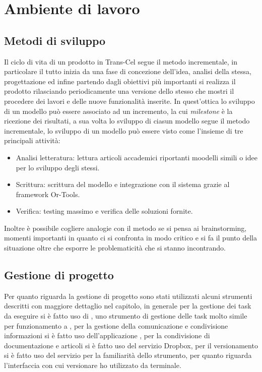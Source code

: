 \section{Ambiente di lavoro}
\subsection{Metodi di sviluppo}
Il ciclo di vita di un prodotto in Trans-Cel segue il metodo incrementale, in particolare il tutto inizia da una fase di concezione dell'idea, analisi della stessa, progettazione ed infine partendo dagli obiettivi più importanti si realizza il prodotto rilasciando periodicamente una versione dello stesso che mostri il procedere dei lavori e delle nuove funzionalità inserite. In quest'ottica lo sviluppo di un modello può essere associato ad un incremento, la cui \textit{milestone} è la ricezione dei risultati, a sua volta lo sviluppo di ciasun modello segue il metodo incrementale, lo sviluppo di un modello può essere visto come l'insieme di tre principali attività:
\begin{itemize}
	\item Analisi letteratura: lettura articoli accademici riportanti moodelli simili o idee per lo sviluppo degli stessi.
	\item Scrittura: scrittura del modello e integrazione con il sistema grazie al framework Or-Tools.
	\item Verifica: testing massimo e verifica delle soluzioni fornite.
\end{itemize}
Inoltre è possibile cogliere analogie con il metodo  se si pensa ai brainstorming, momenti importanti in quanto ci si confronta in modo critico e si fa il punto della situazione oltre che esporre le problematicità che si stanno incontrando.
	
\subsection{Gestione di progetto}
Per quanto riguarda la gestione di progetto sono stati utilizzati alcuni strumenti descritti con maggiore dettaglio nel capitolo, in generale per la gestione dei task da eseguire si è fatto uso di , uno strumento di gestione delle task molto simile per funzionamento a , per la gestione della comunicazione e condivisione informazioni si è fatto uso dell'applicazione , per la condivisione di documentazione e articoli si è fatto uso del servizio Dropbox, per il versionamento si è fatto uso del servizio  per la familiarità dello strumento, per quanto riguarda l'interfaccia con cui versionare ho utilizzato  da terminale.
	
